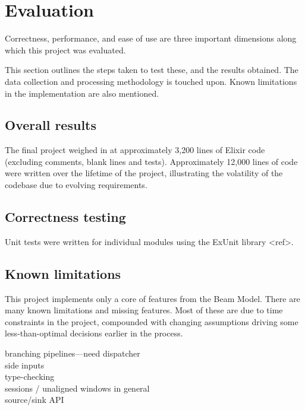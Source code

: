 \chapter{Evaluation}\label{ch:eval}

Correctness, performance, and ease of use are three important dimensions along which this project was evaluated.

This section outlines the steps taken to test these, and the results obtained.
The data collection and processing methodology is touched upon.
Known limitations in the implementation are also mentioned.


\section{Overall results}\label{sec:eval:overall}

The final project weighed in at approximately 3,200 lines of Elixir code (excluding comments, blank lines and tests).
Approximately 12,000 lines of code were written over the lifetime of the project, illustrating the volatility of the codebase due to evolving requirements.



\section{Correctness testing}\label{sec:eval:correctness}

Unit tests were written for individual modules using the ExUnit library <ref>.

\section{Known limitations}\label{sec:eval:limitations}

This project implements only a core of features from the Beam Model.
There are many known limitations and missing features.
Most of these are due to time constraints in the project, compounded with changing assumptions driving some less-than-optimal decisions earlier in the process.

branching pipelines---need dispatcher\\
side inputs\\
type-checking\\
sessions / unaligned windows in general\\
source/sink API\\



